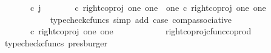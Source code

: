 \begin{isabellebody}
\ {\isachardoublequoteopen}{\isacharparenleft}{\kern0pt}{\isasymlangle}{\isasymf}{\isacharcomma}{\kern0pt}\ {\isasymf}{\isasymrangle}{\isasymamalg}\ {\isacharparenleft}{\kern0pt}{\isasymlangle}{\isasymt}{\isacharcomma}{\kern0pt}\ {\isasymf}{\isasymrangle}\ {\isasymamalg}{\isasymlangle}{\isasymf}{\isacharcomma}{\kern0pt}\ {\isasymt}{\isasymrangle}{\isacharparenright}{\kern0pt}{\isacharparenright}{\kern0pt}\ {\isasymcirc}\isactrlsub c\ j\ {\isacharequal}{\kern0pt}\ {\isacharparenleft}{\kern0pt}{\isacharparenleft}{\kern0pt}{\isasymlangle}{\isasymf}{\isacharcomma}{\kern0pt}\ {\isasymf}{\isasymrangle}{\isasymamalg}\ {\isacharparenleft}{\kern0pt}{\isasymlangle}{\isasymt}{\isacharcomma}{\kern0pt}\ {\isasymf}{\isasymrangle}\ {\isasymamalg}{\isasymlangle}{\isasymf}{\isacharcomma}{\kern0pt}\ {\isasymt}{\isasymrangle}{\isacharparenright}{\kern0pt}{\isacharparenright}{\kern0pt}\ {\isasymcirc}\isactrlsub c\ right{\isacharunderscore}{\kern0pt}coproj\ one\ {\isacharparenleft}{\kern0pt}one\ {\isasymCoprod}\ one{\isacharparenright}{\kern0pt}{\isacharparenright}{\kern0pt}\ {\isasymcirc}\isactrlsub c\ right{\isacharunderscore}{\kern0pt}coproj\ one\ one{\isachardoublequoteclose}\isanewline
\ \ \ \ \ \ \ \ \ \ \isamarkupfalse%
\ {\isacharparenleft}{\kern0pt}typecheck{\isacharunderscore}{\kern0pt}cfuncs{\isacharcomma}{\kern0pt}\ simp\ add{\isacharcolon}{\kern0pt}\ case{}\ comp{\isacharunderscore}{\kern0pt}associative{}{\isacharparenright}{\kern0pt}\isanewline
\ \ \ \ \ \ \ \ \isamarkupfalse%
\ \isamarkupfalse%
\ {\isachardoublequoteopen}{\isachardot}{\kern0pt}{\isachardot}{\kern0pt}{\isachardot}{\kern0pt}\ {\isacharequal}{\kern0pt}\ {\isacharparenleft}{\kern0pt}{\isasymlangle}{\isasymt}{\isacharcomma}{\kern0pt}\ {\isasymf}{\isasymrangle}\ {\isasymamalg}{\isasymlangle}{\isasymf}{\isacharcomma}{\kern0pt}\ {\isasymt}{\isasymrangle}{\isacharparenright}{\kern0pt}\ {\isasymcirc}\isactrlsub c\ right{\isacharunderscore}{\kern0pt}coproj\ one\ one{\isachardoublequoteclose}\isanewline
\ \ \ \ \ \ \ \ \ \ \isamarkupfalse%
\ right{\isacharunderscore}{\kern0pt}coproj{\isacharunderscore}{\kern0pt}cfunc{\isacharunderscore}{\kern0pt}coprod\ \isamarkupfalse%
\ {\isacharparenleft}{\kern0pt}typecheck{\isacharunderscore}{\kern0pt}cfuncs{\isacharcomma}{\kern0pt}\ presburger{\isacharparenright}{\kern0pt}\isanewline
\ \ \ \ \ \ \ \ \isamarkupfalse%
\ \isamarkupfalse%
\ {\isachardoublequoteopen}{\isachardot}{\kern0pt}{\isachardot}{\kern0pt}{\isachardot}{\kern0pt}\ {\isacharequal}{\kern0pt}\ {\isasymlangle}{\isasymf}{\isacharcomma}{\kern0pt}\ {\isasymt}{\isasymrangle}{\isachardoublequoteclose}\isanewline

\end{isabellebody}
